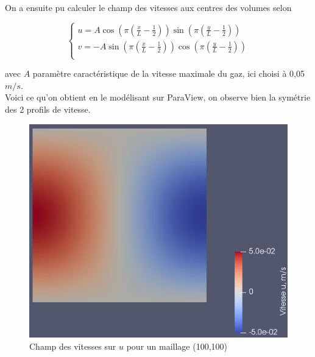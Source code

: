 \documentclass[a4paper,oneside]{article}
\begin{document}
On a ensuite pu calculer le champ des vitesses aux centres des volumes selon 

\begin{equation*}
\begin{cases}
 u = A \cos \left( \pi \left( {\frac{x}{L} - \frac{1}{2}} \right) \right)  \sin \left( \pi \left( \frac{y}{L} - \frac{1}{2}\right) \right) \\
 v = -A \sin \left( \pi \left( {\frac{x}{L} - \frac{1}{2}} \right) \right)  \cos \left( \pi \left( \frac{y}{L} - \frac{1}{2}\right) \right) \\
\end{cases}
\end{equation*}

avec $A$ paramètre caractéristique de la vitesse maximale du gaz, ici choisi à 0,05 $m/s$.\\
Voici ce qu'on obtient en le modélisant sur ParaView, on observe bien la symétrie des 2 profils de vitesse.

\begin{figure}[h!]
\centering
        \includegraphics[scale=0.4]{Champ_Vitesse_Maillage/Champ_Vitesse_u.png}
        \caption{Champ des vitesses sur $u$ pour un maillage (100,100)}

\end{figure}
\end{document}
